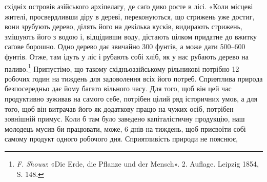східніх островів азійського архіпелагу, де саґо дико росте в лісі.
«Коли місцеві жителі, просвердливши діру в дереві, переконуються,
що стрижень уже достиг, вони зрубують дерево, ділять
його на декілька кусків, видирають стрижень, змішують його
з водою і, відцідивши воду, дістають цілком придатне до вжитку
саґове борошно. Одно дерево дає звичайно 300 фунтів, а може
дати 500--600 фунтів. Отже, там ідуть у ліс і рубають собі хліб,
як у нас рубають дерево на паливо.\footnote{
\emph{F. Shouw}: «Die Erde, die Pflanze und der Mensch». 2. Auflage. Leipzig
1854, S. 148.
} Припустімо, що такому
східньоазійському рільникові потрібно 12 робочих годин на
тиждень для задоволення всіх його потреб. Сприятлива природа
безпосередньо дає йому багато вільного часу. Для того, щоб він
цей час продуктивно зуживав на самого себе, потрібен цілий ряд
історичних умов, а для того, щоб він витрачав його як додаткову
працю на чужих осіб, потрібен зовнішній примус. Коли б там
було заведено капіталістичну продукцію, наш молодець мусив би
працювати, може, 6 днів на тиждень, щоб присвоїти собі самому
продукт одного робочого дня. Сприятливість природи не пояснює,
\parbreak{}  %
